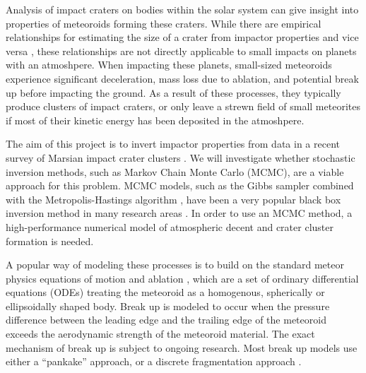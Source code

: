 Analysis of impact craters on bodies within the solar system can give insight into properties of meteoroids forming these craters.
While there are empirical relationships for estimating the size of a crater from impactor properties and vice versa \citep[e.g.][]{holsapple1987scaling}, these relationships are not directly applicable to small impacts on planets with an atmoshpere.
When impacting these planets, small-sized meteoroids experience significant deceleration, mass loss due to ablation, and potential break up before impacting the ground.
As a result of these processes, they typically produce clusters of impact craters, or only leave a strewn field of small meteorites if most of their kinetic energy has been deposited in the atmoshpere.

The aim of this project is to invert impactor properties from data in a recent survey of Marsian impact crater clusters \citep{daubar2019recently}.
We will investigate whether stochastic inversion methods, such as Markov Chain Monte Carlo (MCMC), are a viable approach for this problem.
MCMC models, such as the Gibbs sampler combined with the Metropolis-Hastings algorithm \citep{gelfand1990sampling}, have been a very popular black box inversion method in many research areas \citep[in epidemiology e.g.][]{flaxman2020estimating}.
In order to use an MCMC method, a high-performance numerical model of atmospheric decent and crater cluster formation is needed.

A popular way of modeling these processes is to build on the standard meteor physics equations of motion and ablation \citep[e.g.][]{opik1958physics}, which are a set of ordinary differential equations (ODEs) treating the meteoroid as a homogenous, spherically or ellipsoidally shaped body.
Break up is modeled to occur when the pressure difference between the leading edge and the trailing edge of the meteoroid exceeds the aerodynamic strength of the meteoroid material.
The exact mechanism of break up is subject to ongoing research. Most break up models use either a ``pankake'' approach, or a discrete fragmentation approach \citep{register2017asteroid}.

